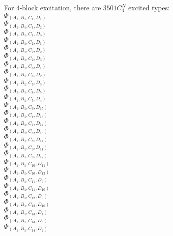 \documentclass[14pt]{article}
\begin{document}
    For 4-block excitation, there are $ 3501C^N_4 $ excited types: \\ 
    $\Phi_{({A}_{1}, {B}_{1}, {C}_{1}, {D}_{1})}$ \\ 
    $\Phi_{({A}_{1}, {B}_{1}, {C}_{1}, {D}_{2})}$ \\ 
    $\Phi_{({A}_{1}, {B}_{1}, {C}_{1}, {D}_{3})}$ \\ 
    $\Phi_{({A}_{1}, {B}_{1}, {C}_{2}, {D}_{1})}$ \\ 
    $\Phi_{({A}_{1}, {B}_{1}, {C}_{2}, {D}_{2})}$ \\ 
    $\Phi_{({A}_{1}, {B}_{1}, {C}_{2}, {D}_{3})}$ \\ 
    $\Phi_{({A}_{1}, {B}_{1}, {C}_{3}, {D}_{1})}$ \\ 
    $\Phi_{({A}_{1}, {B}_{1}, {C}_{3}, {D}_{2})}$ \\ 
    $\Phi_{({A}_{1}, {B}_{1}, {C}_{3}, {D}_{3})}$ \\ 
    $\Phi_{({A}_{1}, {B}_{1}, {C}_{4}, {D}_{5})}$ \\ 
    $\Phi_{({A}_{1}, {B}_{1}, {C}_{5}, {D}_{4})}$ \\ 
    $\Phi_{({A}_{1}, {B}_{1}, {C}_{6}, {D}_{15})}$ \\ 
    $\Phi_{({A}_{1}, {B}_{1}, {C}_{7}, {D}_{13})}$ \\ 
    $\Phi_{({A}_{1}, {B}_{1}, {C}_{7}, {D}_{14})}$ \\ 
    $\Phi_{({A}_{1}, {B}_{1}, {C}_{8}, {D}_{13})}$ \\ 
    $\Phi_{({A}_{1}, {B}_{1}, {C}_{8}, {D}_{14})}$ \\ 
    $\Phi_{({A}_{1}, {B}_{1}, {C}_{9}, {D}_{11})}$ \\ 
    $\Phi_{({A}_{1}, {B}_{1}, {C}_{9}, {D}_{12})}$ \\ 
    $\Phi_{({A}_{1}, {B}_{1}, {C}_{10}, {D}_{11})}$ \\ 
    $\Phi_{({A}_{1}, {B}_{1}, {C}_{10}, {D}_{12})}$ \\ 
    $\Phi_{({A}_{1}, {B}_{1}, {C}_{11}, {D}_{9})}$ \\ 
    $\Phi_{({A}_{1}, {B}_{1}, {C}_{11}, {D}_{10})}$ \\ 
    $\Phi_{({A}_{1}, {B}_{1}, {C}_{12}, {D}_{9})}$ \\ 
    $\Phi_{({A}_{1}, {B}_{1}, {C}_{12}, {D}_{10})}$ \\ 
    $\Phi_{({A}_{1}, {B}_{1}, {C}_{13}, {D}_{7})}$ \\ 
    $\Phi_{({A}_{1}, {B}_{1}, {C}_{13}, {D}_{8})}$ \\ 
    $\Phi_{({A}_{1}, {B}_{1}, {C}_{14}, {D}_{7})}$ \\ 
\end{document}

